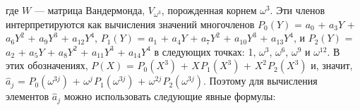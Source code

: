 \newpage
{}

\noindent где $W$ --- матрица Вандермонда, $V_{\omega^3}$, порожденная корнем $\omega^3$. Эти  членов интерпретируются как вычисления значений многочленов \linebreak
$P_0(Y)$ = $a_0$ + $a_3Y$ + $a_6Y^2$ + $a_9Y^3$ + $a_{12}Y^4$, $P_1(Y)$ = $a_1$ + $a_4Y$ + $a_7Y^2$ + \linebreak
$a_{10}Y^3$ +  $a_{13}Y^4$, и $P_2(Y)$ = $a_2$ + $a_5Y$ + $a_8Y^2$ + $a_{11}Y^3$ +  $a_{14}Y^4$ в следующих \linebreak
точках: 1, $\omega^3$, $\omega^6$, $\omega^9$ и $\omega^{12}$. В этих обозначениях, $P(X)$ = $P_0(X^3)$ + \linebreak
$X \hspace{1pt}P_1(X^3)$ + $X^2 \hspace{1pt}P_2(X^3)$ и, значит, $\hat a_j$ = $P_0(\omega^{3j})$ + $\omega^j \hspace{1pt}P_1(\omega^{3j})$ + $\omega^{2j} \hspace{1pt}P_2(\omega^{3j})$. \linebreak
Поэтому для вычисления элементов $\hat a_j$ можно использовать следующие \linebreak
явные формулы:

